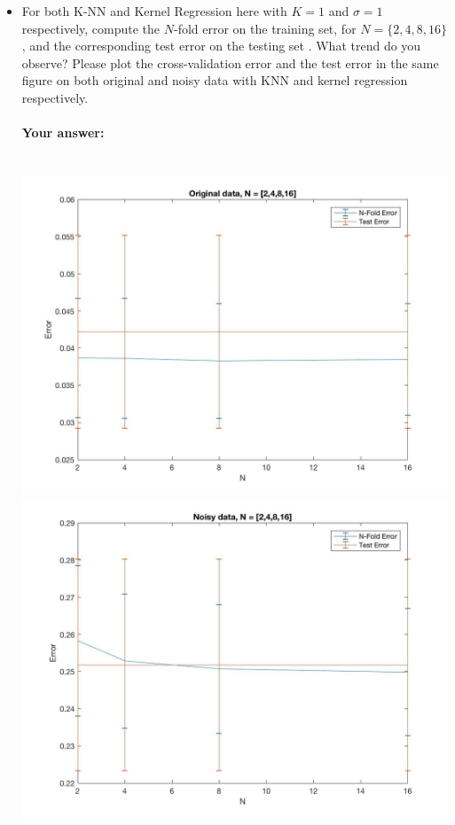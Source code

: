 \documentclass[english]{article}
\begin{document}
\begin{itemize}
\item For both K-NN and Kernel Regression here with $K = 1$ and $\sigma = 1$ respectively, compute the  $N$-fold error on the training set, for $N = \{2, 4, 8, 16\}$, and the corresponding test error on the testing set .  What trend do you observe? Please plot the cross-validation error and the test error in the same figure on both original and noisy data with KNN and kernel regression respectively.

 
 \paragraph{Your answer:}
 ~\\
 
 {\tt  \includegraphics[width=1\textwidth]{original_KNN.jpg}}
 \\    
 
 {\tt \includegraphics[width=1\textwidth]{noisy_KNN.jpg}}
 \\


\end{itemize}
\end{document}
